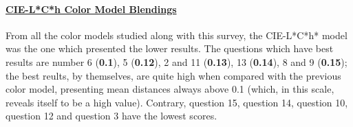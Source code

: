 \paragraph{\ul{CIE-L*C*h Color Model Blendings}} \par
\label{par:lchcolormodel}
%
From all the color models studied along with this survey, the CIE-L*C*h* model was the one which presented the lower results. The questions which have best results are number 6 (\textbf{0.1}), 5 (\textbf{0.12}), 2 and 11 (\textbf{0.13}), 13 (\textbf{0.14}), 8 and 9 (\textbf{0.15});
the best reults, by themselves, are quite high when compared with the previous color model, presenting mean distances always above 0.1 (which, in this scale, reveals itself to be a high value). Contrary, question 15, question 14,
question 10, question 12 and question 3 have the lowest scores. \par
%
